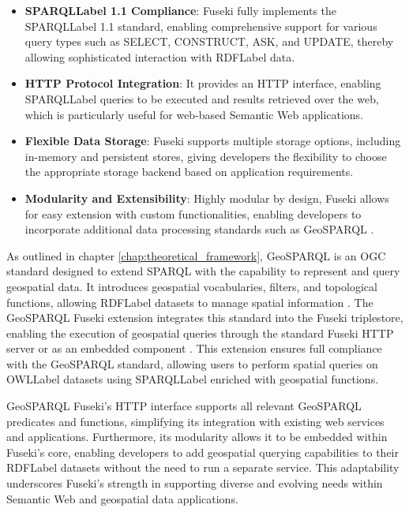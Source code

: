 \begin{itemize}
    \item \textbf{\acrshort{SPARQLLabel} 1.1 Compliance}: Fuseki fully implements the \acrshort{SPARQLLabel} 1.1 standard, enabling comprehensive support for various query types such as SELECT, CONSTRUCT, ASK, and UPDATE, thereby allowing sophisticated interaction with \acrshort{RDFLabel} data.
    \item \textbf{HTTP Protocol Integration}: It provides an HTTP interface, enabling \acrshort{SPARQLLabel} queries to be executed and results retrieved over the web, which is particularly useful for web-based Semantic Web applications.
    \item \textbf{Flexible Data Storage}: Fuseki supports multiple storage options, including in-memory and persistent stores, giving developers the flexibility to choose the appropriate storage backend based on application requirements.
    \item \textbf{Modularity and Extensibility}: Highly modular by design, Fuseki allows for easy extension with custom functionalities, enabling developers to incorporate additional data processing standards such as GeoSPARQL \cite{GeoSPARQLFuseki}.
\end{itemize}

As outlined in chapter \ref{chap:theoretical_framework}, GeoSPARQL is an OGC standard designed to extend SPARQL with the capability to represent and query geospatial data. It introduces geospatial vocabularies, filters, and topological functions, allowing \acrshort{RDFLabel} datasets to manage spatial information \cite{matthewperryOGCGeoSPARQLGeographic2012}. The GeoSPARQL Fuseki extension integrates this standard into the Fuseki triplestore, enabling the execution of geospatial queries through the standard Fuseki HTTP server or as an embedded component \cite{GeoSPARQLFuseki}. This extension ensures full compliance with the GeoSPARQL standard, allowing users to perform spatial queries on \acrshort{OWLLabel} datasets using \acrshort{SPARQLLabel} enriched with geospatial functions. 

GeoSPARQL Fuseki’s HTTP interface supports all relevant GeoSPARQL predicates and functions, simplifying its integration with existing web services and applications. Furthermore, its modularity allows it to be embedded within Fuseki’s core, enabling developers to add geospatial querying capabilities to their \acrshort{RDFLabel} datasets without the need to run a separate service. This adaptability underscores Fuseki's strength in supporting diverse and evolving needs within Semantic Web and geospatial data applications.

